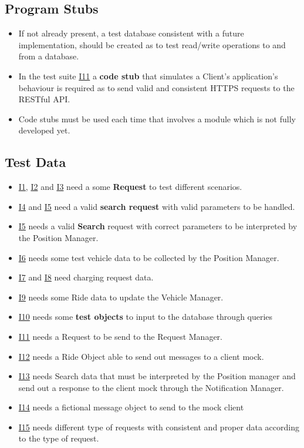 \subsection{Program Stubs}
\begin{itemize}
\item If not already present, a test database consistent with a future implementation, should be created as to test read/write operations to and from a database.
\item In the test suite \hyperref[sub:IT11]{I11} a \textbf{code stub} that simulates a Client's application's behaviour is required as to send valid and consistent HTTPS requests to the RESTful API. 
\item Code stubs must be used each time that involves a module which is not fully developed yet.
\end{itemize}


\subsection{Test Data}
\begin{itemize}
\item \hyperref[sub:IT1]{I1}, \hyperref[sub:IT2]{I2} and \hyperref[sub:IT3]{I3}  need a some \textbf{Request} to test different scenarios.
\item \hyperref[sub:IT4]{I4} and \hyperref[sub:IT5]{I5} need a valid \textbf{search request} with valid parameters to be handled.
\item \hyperref[sub:IT5]{I5} needs a valid \textbf{Search} request with correct parameters to be interpreted by the Position Manager.
\item \hyperref[sub:IT6]{I6} needs some test vehicle data to be collected by the Position Manager.
\item \hyperref[sub:IT7]{I7} and \hyperref[sub:I8]{I8} need charging request data.
\item \hyperref[sub:IT9]{I9} needs some Ride data to update the Vehicle Manager.
\item \hyperref[sub:IT10]{I10} needs some \textbf{test objects} to input to the database through queries
\item \hyperref[sub:IT11]{I11} needs a Request to be send to the Request Manager.
\item \hyperref[sub:IT12]{I12} needs a Ride Object able to send out messages to a client mock.
\item \hyperref[sub:IT13]{I13} needs Search data that must be interpreted by the Position manager and send out a response to the client mock through the Notification Manager.
\item \hyperref[sub:IT14]{I14} needs a fictional message object to send to the mock client
\item \hyperref[sub:IT15]{I15} needs different type of requests with consistent and proper data according to the type of request.
\end{itemize}
